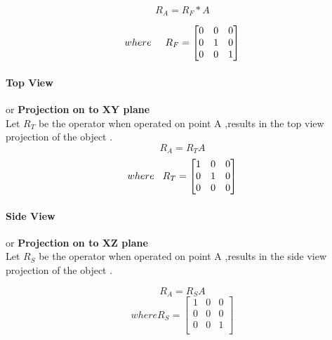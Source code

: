 \documentclass{article}
\begin{document}
\begin{equation}
  R_{A}=R_{F}*A
\end{equation}

\begin{equation} where\hspace{5mm}
R_{F} =
\left[\begin{matrix}
0 & 0 & 0\\
0 & 1 & 0\\
0 & 0 & 1\\
\end{matrix}\right]
\end{equation}


\paragraph{Top View} or \hspace{5mm}\textbf{Projection on to XY plane}\\
Let $R_{T}$ be the operator when operated on point A ,results in the top view projection of the object .
\begin{equation}
  R_{A}=R_{T}A
\end{equation}
\begin{equation} where  \hspace{3mm}
R_{T} =
\left[\begin{matrix}
1 & 0 & 0\\
0 & 1 & 0\\
0 & 0 & 0\\
\end{matrix}\right]
\end{equation}


\paragraph{Side View} or\hspace{5mm} \textbf{Projection on to XZ plane}\\
Let $R_{S}$ be the operator when operated on point A ,results in the side view projection of the object .

\begin{equation}
R_{A}=R_{S}A
\end{equation}
\begin{equation} where
R_{S} =
\left[\begin{matrix}
1 & 0 & 0\\
0 & 0 & 0\\
0 & 0 & 1\\
\end{matrix}\right]
\end{equation}
\end{document}
